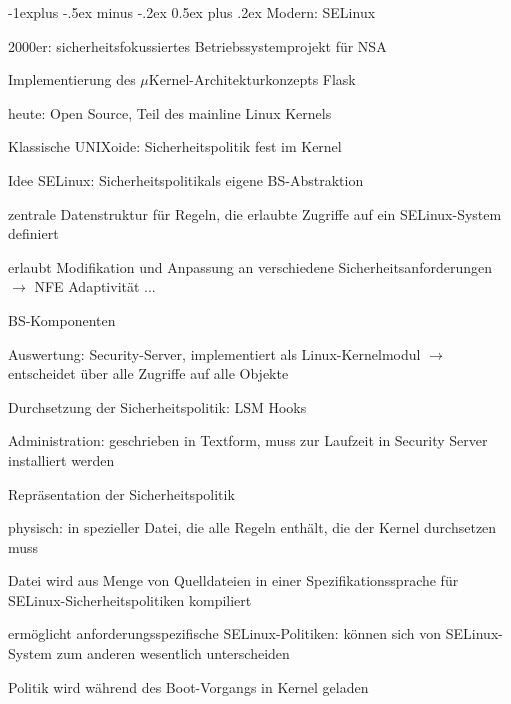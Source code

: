 \documentclass[a4paper]{article}
\makeatletter
\renewcommand{\subsection}{\@startsection{subsection}{2}{0mm}%
 {-1explus -.5ex minus -.2ex}%
 {0.5ex plus .2ex}%
 {\normalfont\normalsize\bfseries}}
\makeatother
\begin{document}
\begin{multicols}{3}
    \subsection{Modern: SELinux}
    \begin{itemize*}
        \item 2000er: sicherheitsfokussiertes Betriebssystemprojekt für NSA
        \item Implementierung des $\mu$Kernel-Architekturkonzepts Flask
        \item heute: Open Source, Teil des mainline Linux Kernels
        \item Klassische UNIXoide: Sicherheitspolitik fest im Kernel
        \item Idee SELinux: Sicherheitspolitikals eigene BS-Abstraktion
        \begin{itemize*}
            \item zentrale Datenstruktur für Regeln, die erlaubte Zugriffe auf ein SELinux-System definiert
            \item erlaubt Modifikation und Anpassung an verschiedene Sicherheitsanforderungen $\rightarrow$ NFE Adaptivität ...
        \end{itemize*}
    \end{itemize*}

    BS-Komponenten
    \begin{itemize*}
        \item Auswertung: Security-Server, implementiert als Linux-Kernelmodul $\rightarrow$ entscheidet über alle Zugriffe auf alle Objekte
        \item Durchsetzung der Sicherheitspolitik: LSM Hooks
        \item Administration: geschrieben in Textform, muss zur Laufzeit in Security Server installiert werden
    \end{itemize*}

    Repräsentation der Sicherheitspolitik
    \begin{itemize*}
        \item physisch: in spezieller Datei, die alle Regeln enthält, die der Kernel durchsetzen muss
        \item Datei wird aus Menge von Quelldateien in einer Spezifikationssprache für SELinux-Sicherheitspolitiken kompiliert
        \item ermöglicht anforderungsspezifische SELinux-Politiken: können sich von SELinux-System zum anderen wesentlich unterscheiden
        \item Politik wird während des Boot-Vorgangs in Kernel geladen
    \end{itemize*}


\end{multicols}
\end{document}
